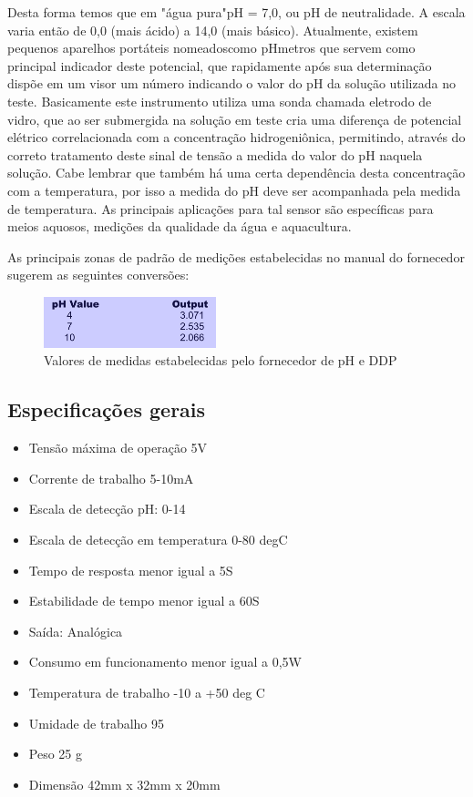 Desta forma temos que em "água pura"pH = 7,0, ou pH de neutralidade. A escala varia
então de 0,0 (mais ácido) a 14,0 (mais básico). Atualmente, existem pequenos aparelhos portáteis
nomeadoscomo pHmetros que servem como principal indicador deste potencial, que rapidamente
após sua determinação dispõe em um visor um número indicando o valor do pH da solução
utilizada no teste. Basicamente este instrumento utiliza uma sonda chamada eletrodo de vidro, que
ao ser submergida na solução em teste cria uma diferença de potencial elétrico correlacionada com
a concentração hidrogeniônica, permitindo, através do correto tratamento deste sinal de tensão a
medida do valor do pH naquela solução. Cabe lembrar que também há uma certa dependência
desta concentração com a temperatura, por isso a medida do pH deve ser acompanhada pela
medida de temperatura.
As principais aplicações para tal sensor são específicas para meios aquosos, medições da
qualidade da água e aquacultura. 

As principais zonas de padrão de medições estabelecidas no
manual do fornecedor sugerem as seguintes conversões:

\begin{figure}[H]
	\centering
	\includegraphics[width=5cm]{figuras/valores_ph.png}
	\caption{Valores de medidas estabelecidas pelo fornecedor de pH e DDP}
	\label{valores_ph}
\end{figure}

\subsection{Especificações gerais}

\begin{itemize}
	\item Tensão máxima de operação 5V
	\item Corrente de trabalho 5-10mA
	\item Escala de detecção pH: 0-14
	\item Escala de detecção em temperatura 0-80 degC
	\item Tempo de resposta menor igual a 5S
	\item Estabilidade de tempo menor igual a 60S
	\item Saída: Analógica
	\item Consumo em funcionamento menor igual a 0,5W
	\item Temperatura de trabalho -10 a +50 deg C
	\item Umidade de trabalho 95 %
	\item Peso 25 g
	\item Dimensão 42mm x 32mm x 20mm
\end{itemize}

